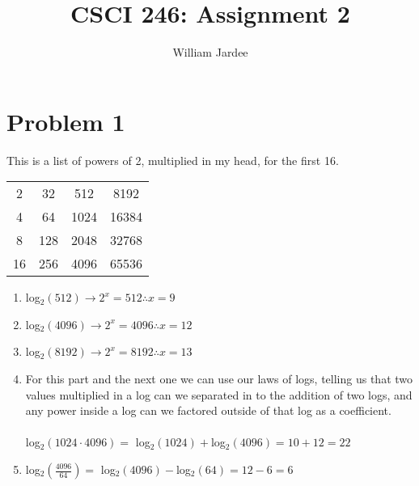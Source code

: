 \documentclass[11pt]{article}
\begin{document}
\date{}

\title{CSCI 246: Assignment 2}

\author{William Jardee}

\maketitle


\section*{Problem 1}
This is a list of powers of 2, multiplied in my head, for the first 16. 
\begin{center}
\begin{tabular}{c c c c}
     2 & 32 & 512 & 8192      \\
     4 & 64 & 1024 & 16384    \\
     8 & 128 & 2048 & 32768   \\
     16 & 256 & 4096 & 65536  \\
\end{tabular}
\end{center}

\begin{enumerate}
    \item 
    log$_2(512) \rightarrow 2^x = 512 \therefore \boxed{x = 9}$ 
    \item
    log$_2(4096) \rightarrow 2^x = 4096 \therefore \boxed{x = 12}$ 
    \item
    log$_2(8192) \rightarrow 2^x = 8192 \therefore \boxed{x = 13}$ 
    \item
    For this part and the next one we can use our laws of logs, telling us that two values multiplied in a log can we separated in to the addition of two logs, and any power inside a log can we factored outside of that log as a coefficient.\\\\
    log$_2(1024 \cdot 4096) =$ log$_2(1024) + $log$_2(4096) = 10+12 = \boxed{22}$
    \item
    log$_2(\frac{4096}{64}) =$ log$_2(4096) - $log$_2(64) = 12-6= \boxed{6}$ 

 
\end{enumerate}

\newpage
\end{document}
